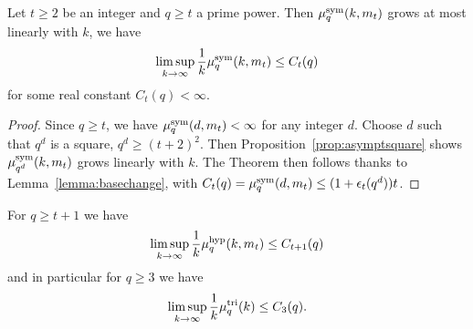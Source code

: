 \documentclass[11pt]{article}
\begin{document}
\begin{thm}
Let $t\geq2$ be an integer and $q\geq t$ a prime power. Then $\mu^{\textrm{sym}}_q(k,m_t)$ grows at most linearly with $k$, \ie we have
\[
\limsup_{k\to\infty}\frac{1}{k}\mu^{\textrm{sym}}_q(k,m_t)\leq C_t(q)
\]
for some real constant $C_t(q)<\infty$.
\end{thm}
\begin{proof}
Since $q\geq t$, we have $\mu^{\textrm{sym}}_q(d,m_t)<\infty$ for any integer $d$.
Choose $d$ such that $q^d$ is a square, $q^d\geq(t+2)^2$.
Then Proposition~\ref{prop:asymptsquare} shows $\mu^{\textrm{sym}}_{q^d}(k,m_t)$ grows linearly with $k$.
The Theorem then follows thanks to Lemma~\ref{lemma:basechange}, with $C_t(q)=\mu^{\textrm{sym}}_q(d,m_t)\leq(1+\epsilon_t(q^d))t$.
\end{proof}
\begin{cor}
For $q\geq t+1$ we have
\[
\limsup_{k\to\infty}\frac{1}{k}\mu^{\textrm{hyp}}_q(k,m_t)\leq C_{t+1}(q)
\]
and in particular for $q\geq 3$ we have
\[
\limsup_{k\to\infty}\frac{1}{k}\mu^{\textrm{tri}}_q(k)\leq C_{3}(q).
\]
\end{cor}
\end{document}
